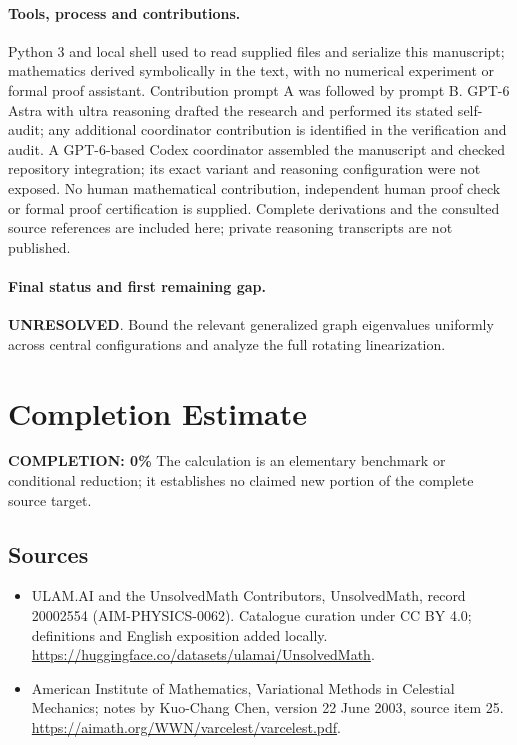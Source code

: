 \documentclass[11pt]{article}
\begin{document}
\paragraph{Tools, process and contributions.}
Python 3 and local shell used to read supplied files and serialize this manuscript; mathematics derived symbolically in the text, with no numerical experiment or formal proof assistant. Contribution prompt A was followed by prompt B. GPT-6 Astra with ultra reasoning drafted the research and performed its stated self-audit; any additional coordinator contribution is identified in the verification and audit. A GPT-6-based Codex coordinator assembled the manuscript and checked repository integration; its exact variant and reasoning configuration were not exposed. No human mathematical contribution, independent human proof check or formal proof certification is supplied. Complete derivations and the consulted source references are included here; private reasoning transcripts are not published.

\paragraph{Final status and first remaining gap.}
\textbf{UNRESOLVED}. Bound the relevant generalized graph eigenvalues uniformly across central configurations and analyze the full rotating linearization.

\section{Completion Estimate}
\noindent\textbf{COMPLETION: 0\%}
The calculation is an elementary benchmark or conditional reduction; it establishes no claimed new portion of the complete source target.

\subsection{Sources}
\begin{itemize}
\item[\hypertarget{source:20002554:1}{S1}] ULAM.AI and the UnsolvedMath Contributors, UnsolvedMath, record 20002554 (AIM-PHYSICS-0062). Catalogue curation under CC BY 4.0; definitions and English exposition added locally.
\url{https://huggingface.co/datasets/ulamai/UnsolvedMath}.
\item[\hypertarget{source:20002554:2}{S2}] American Institute of Mathematics, Variational Methods in Celestial Mechanics; notes by Kuo-Chang Chen, version 22 June 2003, source item 25.
\url{https://aimath.org/WWN/varcelest/varcelest.pdf}.
\end{itemize}
\label{end:20002554}
\end{document}
